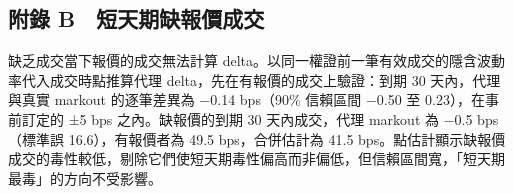 \documentclass[12pt,a4paper]{article}
\begin{document}
\subsection*{附錄 B　短天期缺報價成交}

缺乏成交當下報價的成交無法計算 delta。以同一權證前一筆有效成交的隱含波動率代入成交時點推算代理 delta，先在有報價的成交上驗證：到期 30 天內，代理與真實 markout 的逐筆差異為 −0.14 bps（90\% 信賴區間 −0.50 至 0.23），在事前訂定的 ±5 bps 之內。缺報價的到期 30 天內成交，代理 markout 為 −0.5 bps（標準誤 16.6），有報價者為 49.5 bps，合併估計為 41.5 bps。點估計顯示缺報價成交的毒性較低，剔除它們使短天期毒性偏高而非偏低，但信賴區間寬，「短天期最毒」的方向不受影響。
\end{document}

